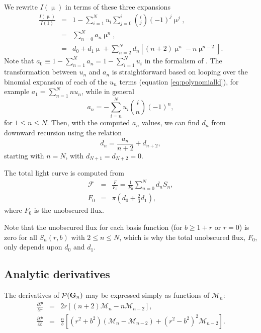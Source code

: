 \documentclass[modern]{aastex61}
\begin{document}
We rewrite $I(\upmu)$ in terms of these three expansions
\begin{eqnarray}
\frac{I(\upmu)}{I(1)} &=& 1 - \sum_{i=1}^N u_i \sum_{j=0}^i \binom{i}{j} (-1)^j \upmu^j,\\
&=& \sum_{n=0}^N a_n \upmu^n,\\
&=& d_0 + d_1 \upmu + \sum_{n=2}^N d_n \left[(n+2)\upmu^n -n \upmu^{n-2}\right].
\end{eqnarray}
Note that $a_0 \equiv 1-\sum_{n=1}^N a_n = 1 - \sum_{i=1}^N u_i$ in the formalism of \citet{Gimenez2006}.
The transformation between $u_n$ and $a_n$ is straightforward based on
looping over the binomial expansion of each of the $u_n$ terms (equation \ref{eq:polynomialld}),
for example $a_1 = \sum_{n=1}^N n u_n$, while in general
\begin{equation}
a_n = -\sum_{i=n}^N u_i \binom{i}{n}(-1)^n,
\end{equation}
for $1 \le n \le N$.
Then, with the computed $a_n$ values, we can find $d_n$ from downward recursion
using the relation
\begin{equation}
d_n = \frac{a_n}{n+2} + d_{n+2},
\end{equation}
starting with $n=N$, with $d_{N+1}=d_{N+2}=0$.

The total light curve is computed from
\begin{eqnarray}\label{eq:flux}
\mathcal{F} &=& \frac{F}{F_0} = \frac{1}{F_0}\sum_{n=0}^N d_n S_n,\\
F_0 &=& \pi(d_0+ \tfrac{2}{3} d_1),
\end{eqnarray}
where $F_0$ is the unobscured flux. 

Note that the unobscured flux for each basis function (for $b \ge 1+r$ or $r=0$) is zero for
all $S_n(r,b)$ with $2 \le n \le N$, which is why the total unobscured flux,
$F_0$, only depends upon $d_0$ and $d_1$.

\subsection{Analytic derivatives}

The derivatives of $\mathcal{P}({\mathbf{G}}_n)$ may be expressed simply as functions
of $\mathcal{M}_n$:
\begin{eqnarray}
\frac{\partial \mathcal{P}}{\partial r} &=& 2r \left[(n+2)\mathcal{M}_n - n \mathcal{M}_{n-2}\right],\\
\frac{\partial \mathcal{P}}{\partial b} &=& \frac{n}{b} \left[(r^2+b^2)(\mathcal{M}_n - \mathcal{M}_{n-2})+(r^2-b^2)^2\mathcal{M}_{n-2}\right].\\
\end{eqnarray}
\end{document}
